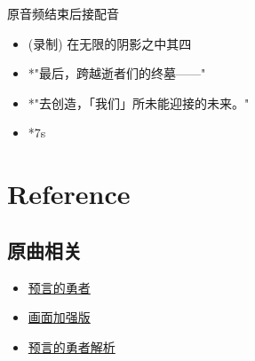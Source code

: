 \documentclass[a4paper]{article}
\begin{document}
原音频结束后接配音

\begin{itemize}
    \item (录制) 在无限的阴影之中其四
    \item *"最后，跨越逝者们的终墓——"
    \item *"去创造，「我们」所未能迎接的未来。"
    \item *7s
\end{itemize}


\section{Reference}

\subsection{原曲相关}

\begin{itemize}
    \item \href{https://www.bilibili.com/video/BV1Zf4y1Z75m/}{预言的勇者}
    \item \href{https://www.bilibili.com/video/BV1rr4y177C9/}{画面加强版}
    \item \href{https://www.bilibili.com/video/BV1KT411z7Vr/}{预言的勇者解析}
\end{itemize}
\end{document}
